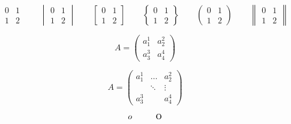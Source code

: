 \documentclass{ctexart}
\begin{document}
    \[
        \begin{matrix}
            0 & 1\\
            1 & 2
        \end{matrix}\qquad
        \begin{vmatrix}%
            0 & 1\\
            1 & 2
        \end{vmatrix}\qquad
        \begin{bmatrix}%
            0 & 1\\
            1 & 2
        \end{bmatrix}\qquad
        \begin{Bmatrix}%
            0 & 1\\
            1 & 2
        \end{Bmatrix}\qquad
        \begin{pmatrix}%
            0 & 1\\
            1 & 2
        \end{pmatrix}\qquad
        \begin{Vmatrix}%
            0 & 1\\
            1 & 2
        \end{Vmatrix}%
    \]
    
    \[    
    A=\begin{pmatrix}%
            a_{1}^1 & a_{2}^2\\
            a_{3}^3 & a_{4}^4
    \end{pmatrix}
    \]

    \[    
    A=\begin{pmatrix}%
            a_{1}^1 & \dots & a_{2}^2\\
             & \ddots & \vdots \\
            a_{3}^3 &  & a_{4}^4
    \end{pmatrix}
    \]
    
    \[
        \Large{o}
        \qquad
        \text{\Large{o}}
    \]
\end{document}
